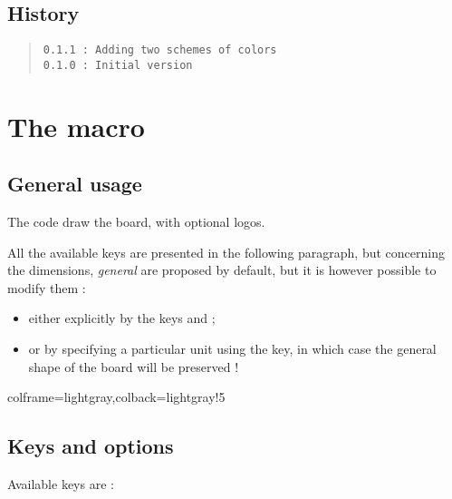\documentclass[11pt,a4paper]{ltxdoc}
\begin{document}
\vfill

\subsection{History}

\begin{quote}
\begin{verbatim}
0.1.1 : Adding two schemes of colors
0.1.0 : Initial version
\end{verbatim}
\end{quote}

\pagebreak

\section{The macro}

\subsection{General usage}

The code draw the board, with optional logos.

All the available keys are presented in the following paragraph, but concerning the dimensions, \textit{general} are proposed by default, but it is however possible to modify them :

\begin{itemize}
	\item either explicitly by the keys \MontreCode{[Radius=]} and \MontreCode{[BorderHeight=]};
	\item or by specifying a particular unit using the \MontreCode{[Unit=]} key, in which case the general shape of the board will be preserved !
\end{itemize}

\begin{tcblisting}{colframe=lightgray,colback=lightgray!5}
\BoardTrivialPursuit[Unit=0.5]
%
\BoardTrivialPursuit[Radius=4,BorderHeight=1.25] %

\BoardTrivialPursuit[Unit=0.33] %
\end{tcblisting}

\pagebreak

\subsection{Keys and options}

Available \textsf{keys} are :
\end{document}
